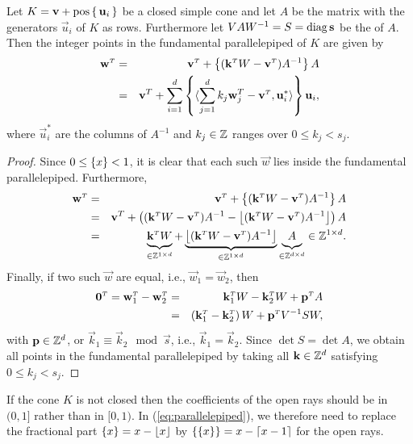 \begin{lemma}
\label{l:fundamental}
Let $K = \vec v + \poshull \lb\, \vec u_i \,\rb$ be a closed simple cone
and let $A$ be the matrix with the generators $\vec u_i$ of $K$
as rows.
Furthermore let $V A W^{-1} = S = \diag \vec s$ be the  of $A$.
Then the integer points in the fundamental parallelepiped of $K$ are given
by
\begin{eqnarray}
\label{eq:parallelepiped}
\vec w^\T & = & \vec v^\T + \fractional{(\vec k^\T W - \vec v^\T) A^{-1}} A
\\
\nonumber
& = &
\vec v^T +
\sum_{i=1}^d
    \fractional{\sps{\sum_{j=1}^d k_j \vec w^T_j - \vec v^\T}{\vec u^*_i}} \vec u_i,
\end{eqnarray}
where $\vec u^*_i$ are the columns of $A^{-1}$ and $k_j \in \mathbb{Z}$ ranges
over $0 \le k_j < s_j$.
\end{lemma}

\begin{proof}
Since $0 \le \left\{x\right\} < 1$, it is clear that each such $\vec w$
lies inside the fundamental parallelepiped.
Furthermore,
\begin{eqnarray*}
\vec w^\T & = & \vec v^\T + \fractional{(\vec k^\T W - \vec v^\T) A^{-1}} A
\\
& = &
\vec v^T + 
\left(
(\vec k^\T W - \vec v^\T) A^{-1} - \floor{(\vec k^\T W - \vec v^\T) A^{-1}}
\right) A
\\
& = &
\underbrace{\vec k^\T W\mathstrut}_{\in \ZZ^{1\times d}}
+
\underbrace{\floor{(\vec k^\T W - \vec v^\T) A^{-1}}}_{\in \ZZ^{1\times d}}
\underbrace{A\mathstrut}_{\in \ZZ^{d\times d}} \in \ZZ^{1\times d}.
\end{eqnarray*}
Finally, if two such $\vec w$ are equal, i.e., $\vec w_1 = \vec w_2$,
then
\begin{eqnarray*}
\vec 0^\T = \vec w_1^\T - \vec w_2^\T
& = & \vec k_1^\T W - \vec k_2^\T W + \vec p^\T A
\\
& = & \left(\vec k_1^\T - \vec k_2^\T \right) W + \vec p^\T V^{-1} S W,
\end{eqnarray*}
with $\vec p \in \ZZ^d$,
or $\vec k_1 \equiv \vec k_2 \mod \vec s$, i.e., $\vec k_1 = \vec k_2$.
Since $\det S = \det A$, we obtain all points in the fundamental parallelepiped
by taking all $\vec k \in \ZZ^d$ satisfying $0 \le k_j < s_j$.
\end{proof}

If the cone $K$ is not closed then the coefficients of the open rays
should be in $(0,1]$ rather than in $[0,1)$.
In (\ref{eq:parallelepiped}),
we therefore need to replace the fractional part $\left\{x\right\} = x - \left\lfloor x\right\rfloor$
by $\left\{\left\{x\right\}\right\} = x - \left\lceil x-1\right\rceil$ for the open rays.

